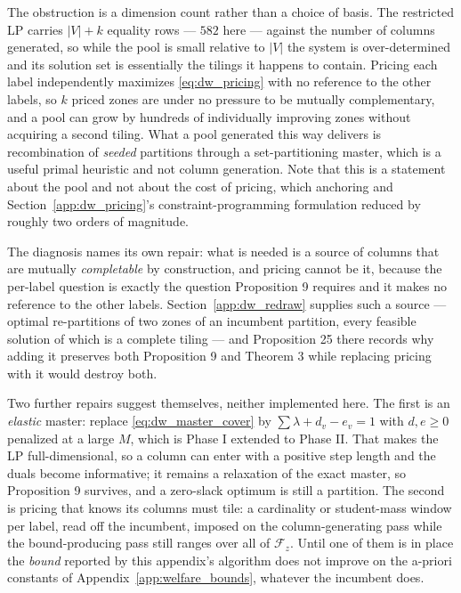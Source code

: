 \documentclass{article}
\begin{document}
The obstruction is a dimension count rather than a choice of basis. The
restricted LP carries $|V| + k$ equality rows --- $582$ here --- against the
number of columns generated, so while the pool is small relative to $|V|$ the
system is over-determined and its solution set is essentially the tilings it
happens to contain. Pricing each label independently maximizes
\eqref{eq:dw_pricing} with no reference to the other labels, so $k$ priced zones
are under no pressure to be mutually complementary, and a pool can grow by
hundreds of individually improving zones without acquiring a second tiling.
What a pool generated this way delivers is recombination of \emph{seeded}
partitions through a set-partitioning master, which is a useful primal heuristic
and not column generation. Note that this is a statement about the pool and not
about the cost of pricing, which anchoring and Section~\ref{app:dw_pricing}'s
constraint-programming formulation reduced by roughly two orders of magnitude.

The diagnosis names its own repair: what is needed is a source of columns that
are mutually \emph{completable} by construction, and pricing cannot be it,
because the per-label question is exactly the question Proposition 9 requires
and it makes no reference to the other labels. Section~\ref{app:dw_redraw}
supplies such a source --- optimal re-partitions of two zones of an incumbent
partition, every feasible solution of which is a complete tiling --- and
Proposition 25 there records why adding it preserves both Proposition 9 and
Theorem 3 while replacing pricing with it would destroy both.

Two further repairs suggest themselves, neither implemented here. The first is
an \emph{elastic} master: replace \eqref{eq:dw_master_cover} by
$\sum \lambda + d_v - e_v = 1$ with $d, e \geq 0$ penalized at a large $M$,
which is Phase I extended to Phase II. That makes the LP full-dimensional, so a
column can enter with a positive step length and the duals become informative;
it remains a relaxation of the exact master, so Proposition 9 survives, and a
zero-slack optimum is still a partition. The second is pricing that knows its
columns must tile: a cardinality or student-mass window per label, read off the
incumbent, imposed on the column-generating pass while the bound-producing pass
still ranges over all of $\mathcal F_z$. Until one of them is in place the
\emph{bound} reported by this appendix's algorithm does not improve on the
a-priori constants of Appendix~\ref{app:welfare_bounds}, whatever the
incumbent does.
\end{document}
